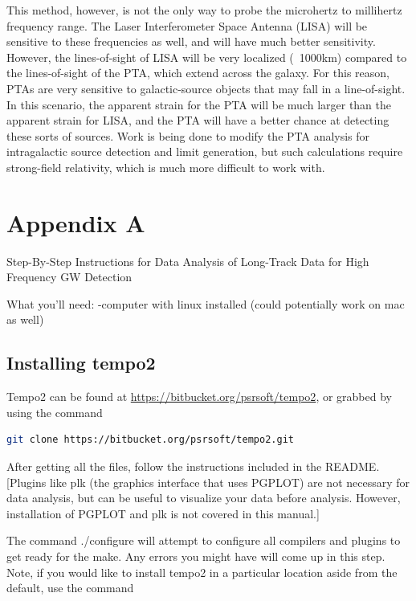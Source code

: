 \documentclass[12pt]{article}
\begin{document}
This method, however, is not the only way to probe the microhertz to millihertz
frequency range. The Laser Interferometer Space Antenna (LISA) will be sensitive
to these frequencies as well, and will have much better sensitivity. However,
the lines-of-sight of LISA will be very localized (~1000km) compared to the
lines-of-sight of the PTA, which extend across the galaxy. For this reason, PTAs
are very sensitive to galactic-source objects that may fall in a line-of-sight.
In this scenario, the apparent strain for the PTA will be much larger than the
apparent strain for LISA, and the PTA will have a better chance at detecting
these sorts of sources. Work is being done to modify the PTA analysis for
intragalactic source detection and limit generation, but such calculations
require strong-field relativity, which is much more difficult to work with.

\section{Appendix A}

Step-By-Step Instructions for Data Analysis of Long-Track Data for High
Frequency GW Detection

What you'll need: -computer with linux installed (could potentially work on mac
as well)

\subsection{Installing tempo2}

Tempo2 can be found at
\url{https://bitbucket.org/psrsoft/tempo2}, or grabbed by using the command

\begin{lstlisting}[language=bash]
git clone https://bitbucket.org/psrsoft/tempo2.git
\end{lstlisting}

After getting all the files, follow the instructions included in the README.
[Plugins like plk (the graphics interface that uses PGPLOT) are not necessary for
data analysis, but can be useful to visualize your data before analysis.
However, installation of PGPLOT and plk is not covered in this manual.]

The command ./configure will attempt to configure all compilers and plugins to
get ready for the make. Any errors you might have will come up in this step.
Note, if you would like to install tempo2 in a particular location aside from
the default, use the command
	
\end{document}
